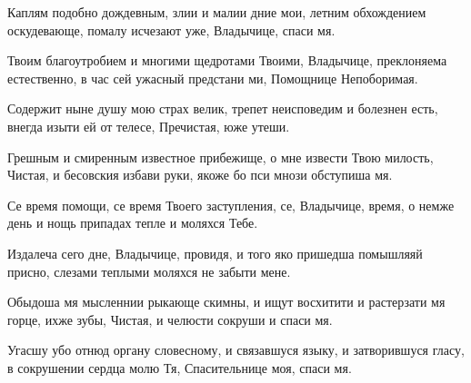 \begin{mymulticols}
 




Каплям подобно дождевным, злии и малии дние мои, летним обхождением оскудевающе, помалу исчезают уже, Владычице, спаси мя. 


Твоим благоутробием и многими щедротами Твоими, Владычице, преклоняема естественно, в час сей ужасный предстани ми, Помощнице Непоборимая. 


Содержит ныне душу мою страх велик, трепет неисповедим и болезнен есть, внегда изыти ей от телесе, Пречистая, юже утеши. 

\slavan

Грешным и смиренным известное прибежище, о мне извести Твою милость, Чистая, и бесовския избави руки, якоже бо пси мнози обступиша мя. 

\inynen

 Се время помощи, се время Твоего заступления, се, Владычице, время, о немже день и нощь припадах тепле и моляхся Тебе.




Издалеча сего дне, Владычице, провидя, и того яко пришедша помышляяй присно, слезами теплыми моляхся не забыти мене. 


Обыдоша мя мысленнии рыкающе скимны, и ищут восхитити и растерзати мя горце, ихже зубы, Чистая, и челюсти сокруши и спаси мя. 


Угасшу убо отнюд органу словесному, и связавшуся языку, и затворившуся гласу, в сокрушении сердца молю Тя, Спасительнице моя, спаси мя. 


\end{mymulticols}
